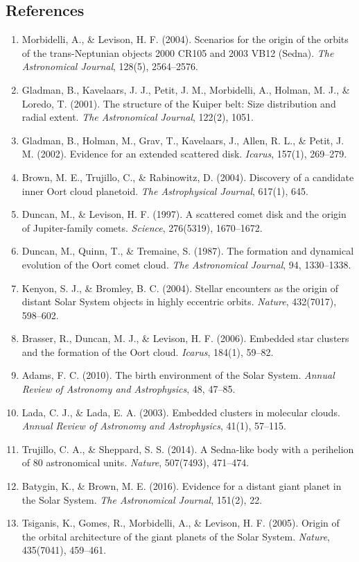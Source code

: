 \documentclass[11pt,a4paper]{article}
\begin{document}
\subsection*{References}
\begin{enumerate}
    \item Morbidelli, A., \& Levison, H. F. (2004). Scenarios for the origin of the orbits of the trans-Neptunian objects 2000 CR105 and 2003 VB12 (Sedna). \textit{The Astronomical Journal}, 128(5), 2564--2576.
    \item Gladman, B., Kavelaars, J. J., Petit, J. M., Morbidelli, A., Holman, M. J., \& Loredo, T. (2001). The structure of the Kuiper belt: Size distribution and radial extent. \textit{The Astronomical Journal}, 122(2), 1051.
    \item Gladman, B., Holman, M., Grav, T., Kavelaars, J., Allen, R. L., \& Petit, J. M. (2002). Evidence for an extended scattered disk. \textit{Icarus}, 157(1), 269--279.
    \item Brown, M. E., Trujillo, C., \& Rabinowitz, D. (2004). Discovery of a candidate inner Oort cloud planetoid. \textit{The Astrophysical Journal}, 617(1), 645.
    \item Duncan, M., \& Levison, H. F. (1997). A scattered comet disk and the origin of Jupiter-family comets. \textit{Science}, 276(5319), 1670--1672.
    \item Duncan, M., Quinn, T., \& Tremaine, S. (1987). The formation and dynamical evolution of the Oort comet cloud. \textit{The Astronomical Journal}, 94, 1330--1338.
    \item Kenyon, S. J., \& Bromley, B. C. (2004). Stellar encounters as the origin of distant Solar System objects in highly eccentric orbits. \textit{Nature}, 432(7017), 598--602.
    \item Brasser, R., Duncan, M. J., \& Levison, H. F. (2006). Embedded star clusters and the formation of the Oort cloud. \textit{Icarus}, 184(1), 59--82.
    \item Adams, F. C. (2010). The birth environment of the Solar System. \textit{Annual Review of Astronomy and Astrophysics}, 48, 47--85.
    \item Lada, C. J., \& Lada, E. A. (2003). Embedded clusters in molecular clouds. \textit{Annual Review of Astronomy and Astrophysics}, 41(1), 57--115.
    \item Trujillo, C. A., \& Sheppard, S. S. (2014). A Sedna-like body with a perihelion of 80 astronomical units. \textit{Nature}, 507(7493), 471--474.
    \item Batygin, K., \& Brown, M. E. (2016). Evidence for a distant giant planet in the Solar System. \textit{The Astronomical Journal}, 151(2), 22.
    \item Tsiganis, K., Gomes, R., Morbidelli, A., \& Levison, H. F. (2005). Origin of the orbital architecture of the giant planets of the Solar System. \textit{Nature}, 435(7041), 459--461.
\end{enumerate}
\end{document}
